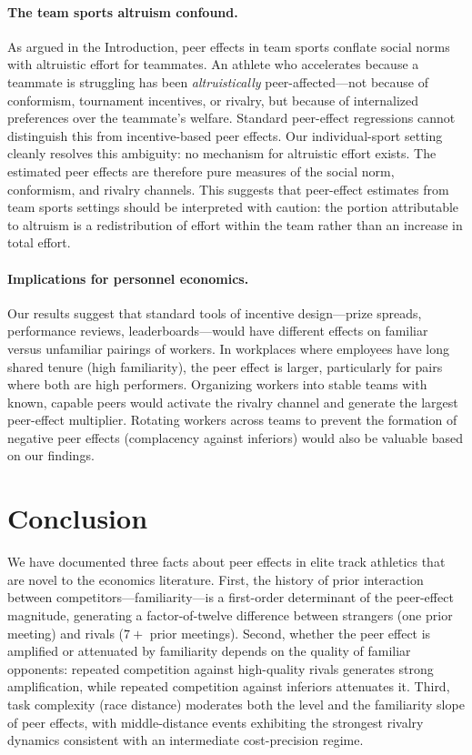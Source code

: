\documentclass[12pt]{article}
\theoremstyle{definition}
\theoremstyle{remark}
\begin{document}
\paragraph{The team sports altruism confound.}
As argued in the Introduction, peer effects in team sports conflate social norms
with altruistic effort for teammates.
An athlete who accelerates because a teammate is struggling has been \textit{altruistically}
peer-affected---not because of conformism, tournament incentives, or rivalry, but
because of internalized preferences over the teammate's welfare.
Standard peer-effect regressions cannot distinguish this from incentive-based
peer effects.
Our individual-sport setting cleanly resolves this ambiguity: no mechanism
for altruistic effort exists.
The estimated peer effects are therefore pure measures of the social norm,
conformism, and rivalry channels.
This suggests that peer-effect estimates from team sports settings should be
interpreted with caution: the portion attributable to altruism is a
redistribution of effort within the team rather than an increase in total effort.

\paragraph{Implications for personnel economics.}
Our results suggest that standard tools of incentive design---prize spreads,
performance reviews, leaderboards---would have different effects on familiar versus
unfamiliar pairings of workers.
In workplaces where employees have long shared tenure (high familiarity), the
peer effect is larger, particularly for pairs where both are high performers.
Organizing workers into stable teams with known, capable peers would activate
the rivalry channel and generate the largest peer-effect multiplier.
Rotating workers across teams to prevent the formation of negative peer effects
(complacency against inferiors) would also be valuable based on our findings.

\section{Conclusion}
\label{sec:conclusion}

We have documented three facts about peer effects in elite track athletics that
are novel to the economics literature.
First, the history of prior interaction between competitors---familiarity---is
a first-order determinant of the peer-effect magnitude, generating a factor-of-twelve
difference between strangers (one prior meeting) and rivals ($7+$ prior meetings).
Second, whether the peer effect is amplified or attenuated by familiarity depends
on the quality of familiar opponents: repeated competition against high-quality
rivals generates strong amplification, while repeated competition against inferiors
attenuates it.
Third, task complexity (race distance) moderates both the level and the familiarity
slope of peer effects, with middle-distance events exhibiting the strongest rivalry
dynamics consistent with an intermediate cost-precision regime.
\end{document}
